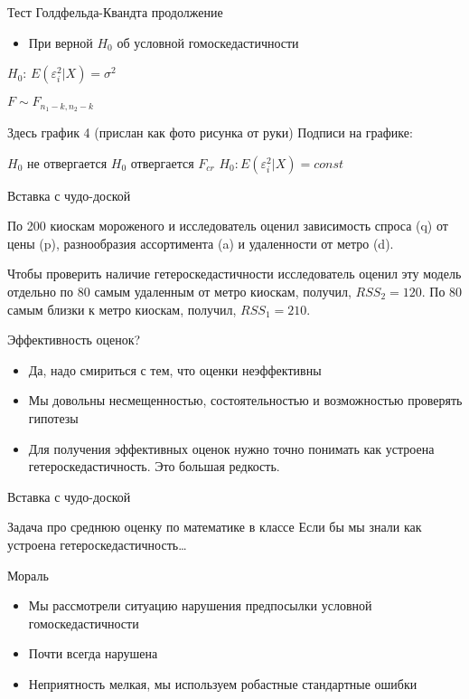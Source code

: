 \documentclass[ignorenonframetext,]{beamer}
\begin{document}
\begin{frame}{Тест Голдфельда-Квандта продолжение}

\begin{itemize}
\itemsep1pt\parskip0pt
\item
  При верной \(H_0\) об условной гомоскедастичности
\end{itemize}

\(H_0\): \(E(\varepsilon^2_i|X)=\sigma^2\)

\(F\sim F_{n_1-k,n_2-k}\)

Здесь график 4 (прислан как фото рисунка от руки) Подписи на графике:

\(H_0\) не отвергается \(H_0\) отвергается \(F_{cr}\)
\(H_0: E(\varepsilon_i^2 | X)=const\)

\end{frame}

\begin{frame}{Вставка с чудо-доской}

По 200 киоскам мороженого и исследователь оценил зависимость спроса (q)
от цены (p), разнообразия ассортимента (a) и удаленности от метро (d).

Чтобы проверить наличие гетероскедастичности исследователь оценил эту
модель отдельно по 80 самым удаленным от метро киоскам, получил,
\(RSS_2=120\). По 80 самым близки к метро киоскам, получил,
\(RSS_1=210\).

\end{frame}

\begin{frame}{Эффективность оценок?}

\begin{itemize}
\item
  Да, надо смириться с тем, что оценки неэффективны
\item
  Мы довольны несмещенностью, состоятельностью и возможностью проверять
  гипотезы
\item
  Для получения эффективных оценок нужно точно понимать как устроена
  гетероскедастичность. Это большая редкость.
\end{itemize}

\end{frame}

\begin{frame}{Вставка с чудо-доской}

Задача про среднюю оценку по математике в классе Если бы мы знали как
устроена гетероскедастичность\ldots{}

\end{frame}

\begin{frame}{Мораль}

\begin{itemize}
\item
  Мы рассмотрели ситуацию нарушения предпосылки условной
  гомоскедастичности
\item
  Почти всегда нарушена
\item
  Неприятность мелкая, мы используем робастные стандартные ошибки
\end{itemize}

\end{frame}
\end{document}
